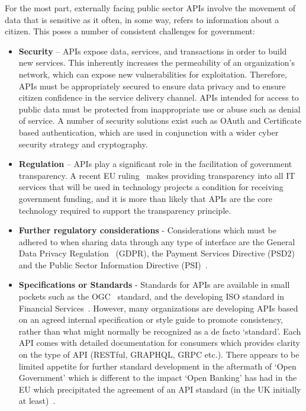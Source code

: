For the most part, externally facing public sector APIs involve the movement
of data that is sensitive as it often, in some way, refers to information about
a citizen. This poses a number of consistent challenges for government:
\begin{itemize}
	\item \textbf{Security} – APIs expose data, services, and transactions in order to
	build new services. This inherently increases the permeability of an
	organization’s network, which can expose new vulnerabilities for
	exploitation. Therefore, APIs must be appropriately secured to ensure data
	privacy and to ensure citizen confidence in the service delivery channel.
	APIs intended for access to public data must be protected from inappropriate
	use or abuse such as denial of service. A number of security solutions exist
	such as OAuth and Certificate based authentication, which are used in
	conjunction with a wider cyber security strategy and cryptography.
	
	\item \textbf{Regulation} – APIs play a significant role in the facilitation of
	government transparency. A recent EU ruling~\citep{eu_funding} makes providing
	transparency into all IT services that will be used in technology projects
	a condition for receiving government funding, and it is more than likely
	that APIs are the core technology required to support the transparency
	principle.
	
	\item \textbf{Further regulatory considerations} - Considerations which
	must be adhered to when	sharing data through any type of interface are
	the General Data Privacy Regulation~\cite{eu_gdpr} (GDPR), the Payment
	Services Directive	(PSD2)~\citep{eu_payment_directives} and the Public Sector Information
	Directive (PSI)~\citep{public_sector_info}.
	
	\item \textbf{Specifications or Standards} - Standards for APIs are available in
	small pockets such as the OGC~\citep{open_geospatial_consortium}	standard, and the developing ISO
	standard in Financial Services~\cite{iso}. However, many organizations are
	developing APIs based on an agreed internal specification or style guide
	to promote consistency, rather than what might normally be recognized as
	a de facto ‘standard’. Each API comes with detailed documentation for
	consumers which	provides clarity on the type of API	(RESTful, GRAPHQL,
	GRPC etc.). There appears to be limited appetite for further standard
	development in the aftermath of ‘Open Government’ which is different 
	to the impact ‘Open Banking’ has had in the EU which precipitated the
	agreement of an API standard (in the UK initially at least)~\citep{interface_standardisation}.
\end{itemize}

